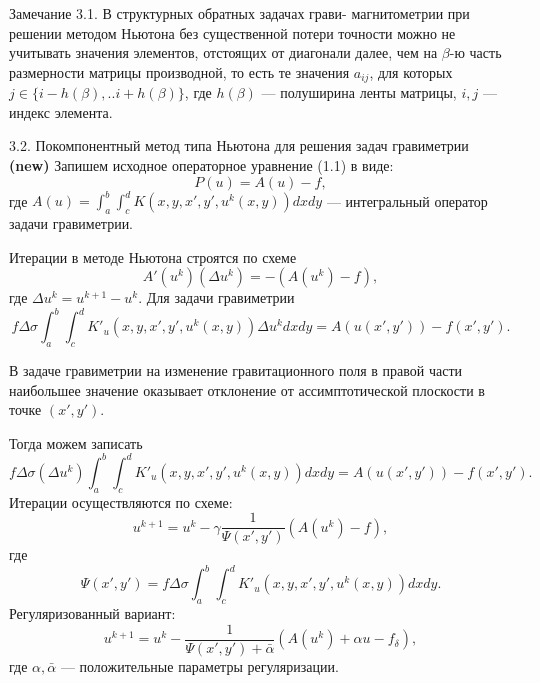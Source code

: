 \documentclass[10pt,pdf, mathserif, hyperref={unicode}]{beamer}
\begin{document}
\begin{frame}
	\begin{block}{Замечание 3.1.}
		В структурных обратных задачах грави- магнитометрии при решении методом Ньютона без существенной потери точности можно не учитывать значения элементов, отстоящих от диагонали далее, чем на  $\beta$-ю часть  размерности матрицы производной, то есть те значения $a_{ij}$, для которых  $j \in \{i-h(\beta),..i+h(\beta)\} $, где $h(\beta)$ --- полуширина ленты матрицы, $i, j$ --- индекс элемента.
	\end{block}
	\let\thefootnote\relax\let\thefootnote\relax{}
\end{frame}
\begin{frame}{3.2. Покомпонентный метод типа Ньютона для решения задач гравиметрии \textbf{(new)}}
	Запишем исходное операторное уравнение (1.1) в виде:
	$$P(u)=A(u)-f,$$
	где $A(u)=\int_{a}^{b}\int_{c}^{d}K(x,y, x',y',u^k(x,y))dxdy$ --- интегральный оператор задачи гравиметрии.
	
	Итерации в методе Ньютона строятся по схеме
	$$A'(u^k)(\Delta u^k)=-(A(u^k)-f),$$ где $\Delta u^k=u^{k+1}-u^k$.
	Для задачи гравиметрии
	$$f\Delta\sigma\int_{a}^{b}\int_{c}^{d}K'_u(x,y, x',y',u^k(x,y))\Delta u^k dxdy=A(u(x',y'))-f(x',y').$$
\end{frame}
\begin{frame}
	В задаче гравиметрии на изменение гравитационного поля в правой части наибольшее значение оказывает отклонение от ассимптотической плоскости в точке $(x',y')$. 
	
	Тогда можем записать
	$$f\Delta\sigma(\Delta u^k)\int_{a}^{b}\int_{c}^{d}K'_u(x,y, x',y',u^k(x,y)) dxdy=A(u(x',y'))-f(x',y').$$
	Итерации осуществляются по схеме:
	$$u^{k+1}=u^k-\gamma\frac{1}{\varPsi(x',y')}(A(u^k)-f),$$
	где $$\varPsi(x',y')=f\Delta\sigma\int_{a}^{b}\int_{c}^{d}K'_u(x,y, x',y',u^k(x,y)) dxdy.$$
	Регуляризованный вариант:
	$$u^{k+1}=u^k-\frac{1}{\varPsi(x',y')+\bar{\alpha}}(A(u^k)+\alpha u-f_\delta),$$
	где $\alpha, \bar{\alpha}$ --- положительные параметры регуляризации.
	\let\thefootnote\relax\let\thefootnote\relax{}
\end{frame}
\end{document}
